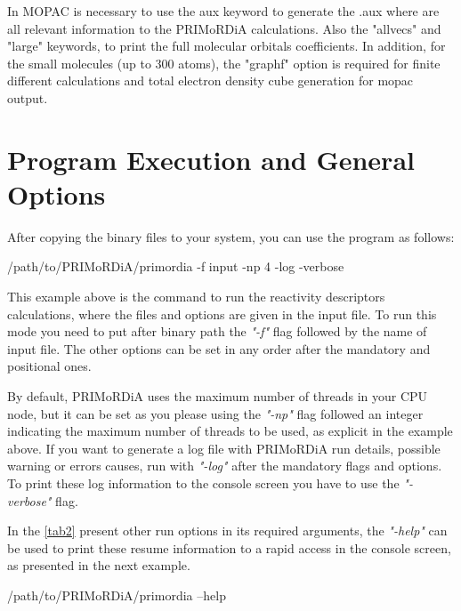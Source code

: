 \documentclass[a4paper,11pt]{refart}
\begin{document}
In MOPAC is necessary to use the aux keyword to generate the .aux where are all  relevant information to the PRIMoRDiA calculations. Also the "allvecs" and "large" keywords, to print the full molecular orbitals coefficients.  In addition, for the small molecules (up to 300 atoms), the "graphf" option is required for finite different calculations and total electron density cube generation for mopac output. 

\section{Program Execution and General Options}

After copying the binary files to your system, you can use the program as follows:

\hspace*{-\leftmarginwidth}
\begin{minipage}{\fullwidth}
\begin{commandshell}
/path/to/PRIMoRDiA/primordia -f input -np 4 -log -verbose 	
\end{commandshell}
\end{minipage}

This example above is the command to run the reactivity descriptors calculations, where the files and options are given in the input file. To run this mode you need to put after binary path  the \emph{"-f"} flag followed by the name of input file. The other options can be set in any order after the mandatory and positional ones. 

By default, PRIMoRDiA uses the maximum number of threads in your CPU node, but it can be set as you please using the \emph{"-np"} flag followed an integer indicating the maximum number of threads to be used, as explicit in the example above. If you want to generate a log file with PRIMoRDiA run details, possible warning or errors causes, run with \emph{"-log"} after the mandatory flags and options. To print these log information to the console screen you have to use the \emph{"-verbose"} flag. 

In the \autoref{tab2} present  other run options in its required arguments, the \emph{"-help"} can be used to print these resume information to a rapid access in the console screen, as presented in the next example.

\hspace*{-\leftmarginwidth}
\begin{minipage}{\fullwidth}
\begin{commandshell}
/path/to/PRIMoRDiA/primordia --help
\end{commandshell}
\end{minipage}
\end{document}
